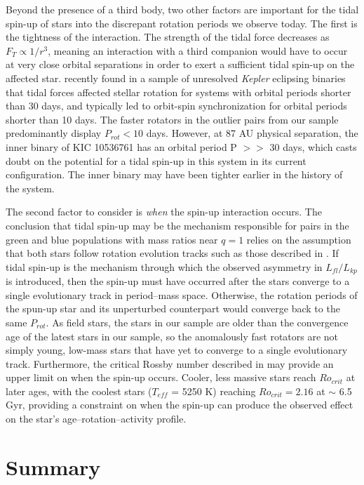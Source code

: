 \documentclass[preprint2]{aastex61}
\newcommand{\Kepler}{\textsl{Kepler}\xspace}
\begin{document}
Beyond the presence of a third body, two other factors are important for the tidal spin-up of stars into the discrepant rotation periods we observe today. The first is the tightness of the interaction. The strength of the tidal force decreases as $F_{T} \propto 1/r^3$, meaning an interaction with a third companion would have to occur at very close orbital separations in order to exert a sufficient tidal spin-up on the affected star. \citet{lurie2017} recently found in a sample of unresolved \Kepler eclipsing binaries that tidal forces affected stellar rotation for systems with orbital periods shorter than 30 days, and typically led to orbit-spin synchronization for orbital periods shorter than 10 days. The faster rotators in the outlier pairs from our sample predominantly display $P_{rot} < 10$ days. However, at 87 AU physical separation, the inner binary of KIC 10536761 has an orbital period P $>>$ 30 days, which casts doubt on the potential for a tidal spin-up in this system in its current configuration. The inner binary may have been tighter earlier in the history of the system. 


The second factor to consider is {\it when} the spin-up interaction occurs. The conclusion that tidal spin-up may be the mechanism responsible for pairs in the green and blue populations with mass ratios near $q=1$ relies on the assumption that both stars follow rotation evolution tracks such as those described in \citet{barnes&kim2010}. 
If tidal spin-up is the mechanism through which the observed asymmetry in $L_{fl}/L_{kp}$ is introduced, then the spin-up must have occurred after the stars converge to a single evolutionary track in period--mass space. Otherwise, the rotation periods of the spun-up star and its unperturbed counterpart would converge back to the same $P_{rot}$. As field stars, the stars in our sample are older than the convergence age of the latest stars in our sample, so the anomalously fast rotators are not simply young, low-mass stars that have yet to converge to a single evolutionary track. Furthermore, the critical Rossby number described in \citet{vansaders2016} may provide an upper limit on when the spin-up occurs. Cooler, less massive stars reach $Ro_{crit}$ at later ages, with the coolest stars ($T_{eff}$ = 5250 K) reaching $Ro_{crit} = 2.16$ at $\sim$ 6.5 Gyr, providing a constraint on when the spin-up can produce the observed effect on the star's age--rotation--activity profile.

\section{Summary}
\label{sec:summary}
\end{document}
